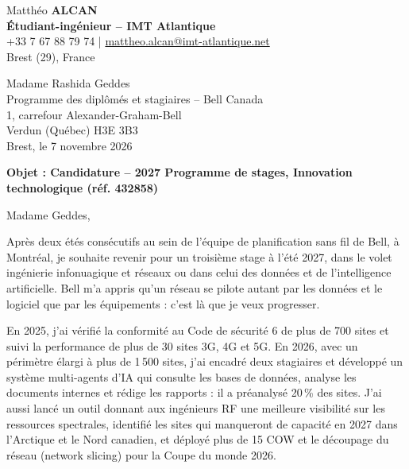 \documentclass[11pt,a4paper]{article}
\begin{document}
{
{\fontsize{20}{22}\selectfont Matthéo \textbf{ALCAN}}\\[3pt]
{\color{navy}\bfseries Étudiant-ingénieur -- IMT Atlantique}\\
+33 7 67 88 79 74 | \href{mailto:mattheo.alcan@imt-atlantique.net}{mattheo.alcan@imt-atlantique.net}\\
Brest (29), France\par}

\vspace{14pt}
{\raggedleft
Madame Rashida Geddes\\
Programme des diplômés et stagiaires -- Bell Canada\\
1, carrefour Alexander-Graham-Bell\\
Verdun (Québec) H3E 3B3\\[12pt]
Brest, le 7 novembre 2026\par}

\vspace{14pt}
{\textbf{Objet : Candidature -- 2027 Programme de stages, Innovation technologique (réf. 432858)}\par}

\vspace{8pt}
Madame Geddes,

\justifying
Après deux étés consécutifs au sein de l'équipe de planification sans fil de Bell, à Montréal, je souhaite revenir pour un troisième stage à l'été 2027, dans le volet ingénierie infonuagique et réseaux ou dans celui des données et de l'intelligence artificielle. Bell m'a appris qu'un réseau se pilote autant par les données et le logiciel que par les équipements : c'est là que je veux progresser.

En 2025, j'ai vérifié la conformité au Code de sécurité 6 de plus de 700 sites et suivi la performance de plus de 30 sites 3G, 4G et 5G. En 2026, avec un périmètre élargi à plus de 1\,500 sites, j'ai encadré deux stagiaires et développé un système multi-agents d'IA qui consulte les bases de données, analyse les documents internes et rédige les rapports : il a préanalysé 20\,\% des sites. J'ai aussi lancé un outil donnant aux ingénieurs RF une meilleure visibilité sur les ressources spectrales, identifié les sites qui manqueront de capacité en 2027 dans l'Arctique et le Nord canadien, et déployé plus de 15 COW et le découpage du réseau (network slicing) pour la Coupe du monde 2026.
\end{document}
